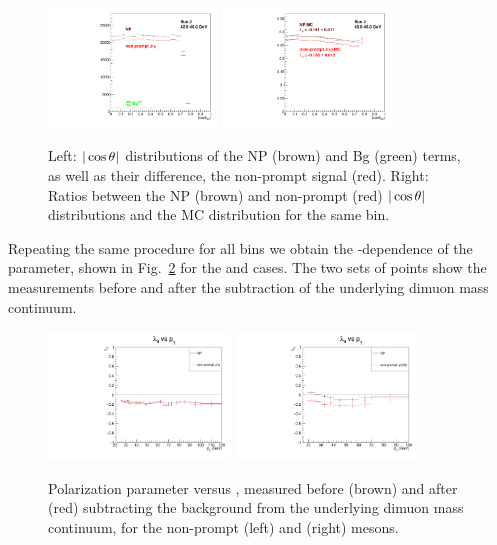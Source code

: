 \begin{figure}[h]
\centering
\includegraphics[width=0.4\textwidth]{Figures/chapter5/bin1B_7-jpsiNP.pdf}
\includegraphics[width=0.4\textwidth]{Figures/chapter5/bin1F_7-jpsiNP.pdf}
\caption{Left: $|\cos\theta|$ distributions of the NP (brown) and Bg (green)
terms, as well as their difference, the non-prompt \jpsi signal (red).
Right: Ratios between the NP (brown) and non-prompt \jpsi (red) 
$|\cos\theta|$ distributions and the MC distribution for the same \pt bin.}
\label{fig:NP-jpsi-costh-ratio}
\end{figure}

Repeating the same procedure for all \pt bins we obtain the \pt-dependence of 
the \lth parameter, shown in Fig.~\ref{fig:NP-jpsi-psip-lth} for the
\jpsi and \psip cases. The two sets of points show the measurements before
and after the subtraction of the underlying dimuon mass continuum.

\begin{figure}[h]
\centering
\includegraphics[width=0.43\textwidth]{Figures/chapter5/par_lth-jpsiNP.pdf}
\includegraphics[width=0.43\textwidth]{Figures/chapter5/par_lth-psipNP.pdf}
\caption{Polarization parameter \lth versus \pt, 
measured before (brown) and after (red)
subtracting the background from the underlying dimuon mass continuum,
for the non-prompt \jpsi (left) and \psip (right) mesons.}
\label{fig:NP-jpsi-psip-lth}
\end{figure}

